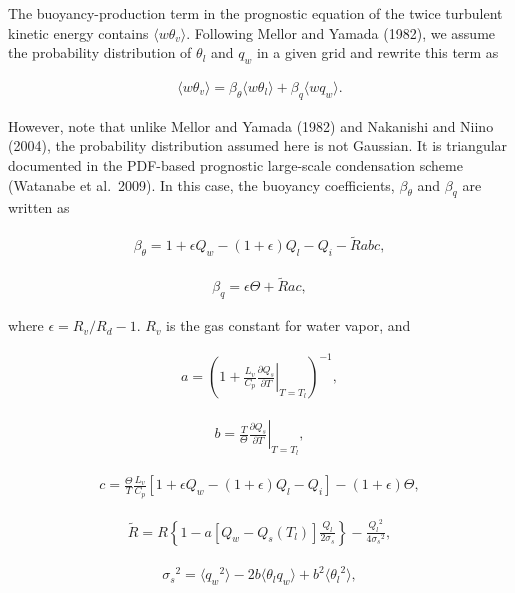 The buoyancy-production term in the prognostic equation of the twice
turbulent kinetic energy contains \(\langle w\theta_v \rangle\).
Following Mellor and Yamada (1982), we assume the probability
distribution of \(\theta_l\) and \(q_w\) in a given grid and rewrite
this term as

\begin{eqnarray}\langle w\theta_v \rangle=\beta_\theta \langle w\theta_l \rangle + \beta_q \langle wq_w \rangle.\end{eqnarray}

However, note that unlike Mellor and Yamada (1982) and Nakanishi and
Niino (2004), the probability distribution assumed here is not Gaussian.
It is triangular documented in the PDF-based prognostic large-scale
condensation scheme (Watanabe et al.~2009). In this case, the buoyancy
coefficients, \(\beta_\theta\) and \(\beta_q\) are written as

\begin{eqnarray}\beta_\theta=1+\epsilon Q_w-(1+\epsilon)Q_l-Q_i-\tilde{R}abc,\end{eqnarray}

\begin{eqnarray}\beta_q=\epsilon \Theta +\tilde{R}ac,\end{eqnarray}

where \(\epsilon=R_v/R_d-1\). \(R_v\) is the gas constant for water
vapor, and

\begin{eqnarray}a=\left(1+\frac{L_v}{C_p}\left.\frac{\partial Q_s}{\partial T}\right|_{T=T_l}\right)^{-1},\end{eqnarray}

\begin{eqnarray}b=\frac{T}{\Theta}\left.\frac{\partial Q_s}{\partial T}\right|_{T=T_l},\end{eqnarray}

\begin{eqnarray}c=\frac{\Theta}{T}\frac{L_v}{C_p}\left[1+\epsilon Q_w-(1+\epsilon)Q_l-Q_i\right]-(1+\epsilon)\Theta,\end{eqnarray}

\begin{eqnarray}\tilde{R}=R\left\{1-a\left[Q_w-Q_s(T_l)\right]\frac{Q_l}{2\sigma_s}\right\}-\frac{{Q_l}^2}{4{\sigma_s}^2},\end{eqnarray}

\begin{eqnarray}{\sigma_s}^2=\langle {q_w}^2 \rangle -2b \langle \theta_l q_w \rangle + b^2\langle {\theta_l}^2 \rangle,\end{eqnarray}

